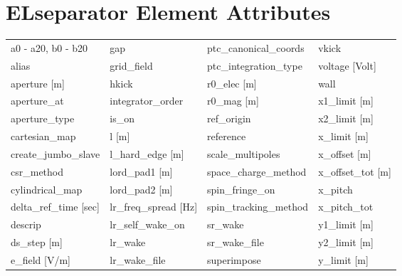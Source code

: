  \section{ELseparator Element Attributes}
 \label{s:list.elseparator}
 
 \begin{tabular}{llll} \toprule
a0 - a20, b0 - b20             & gap                            & ptc_canonical_coords           & vkick                          \\
alias                          & grid_field                     & ptc_integration_type           & voltage [Volt]                 \\
aperture [m]                   & hkick                          & r0_elec [m]                    & wall                           \\
aperture_at                    & integrator_order               & r0_mag [m]                     & x1_limit [m]                   \\
aperture_type                  & is_on                          & ref_origin                     & x2_limit [m]                   \\
cartesian_map                  & l [m]                          & reference                      & x_limit [m]                    \\
create_jumbo_slave             & l_hard_edge [m]                & scale_multipoles               & x_offset [m]                   \\
csr_method                     & lord_pad1 [m]                  & space_charge_method            & x_offset_tot [m]               \\
cylindrical_map                & lord_pad2 [m]                  & spin_fringe_on                 & x_pitch                        \\
delta_ref_time [sec]           & lr_freq_spread [Hz]            & spin_tracking_method           & x_pitch_tot                    \\
descrip                        & lr_self_wake_on                & sr_wake                        & y1_limit [m]                   \\
ds_step [m]                    & lr_wake                        & sr_wake_file                   & y2_limit [m]                   \\
e_field [V/m]                  & lr_wake_file                   & superimpose                    & y_limit [m]                    \\

\end{tabular}
